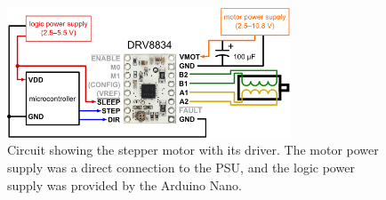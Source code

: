 \begin{figure}[h!]
	\begin{center}
		\includegraphics[width=0.75\textwidth]{figures/stepper-motor-circuit.png}
		\caption{Circuit showing the stepper motor with its driver. The motor power supply was a direct connection to the PSU, and the logic power supply was provided by the Arduino Nano.}
		\label{fig:motor-circuit}
	\end{center}
\end{figure}
